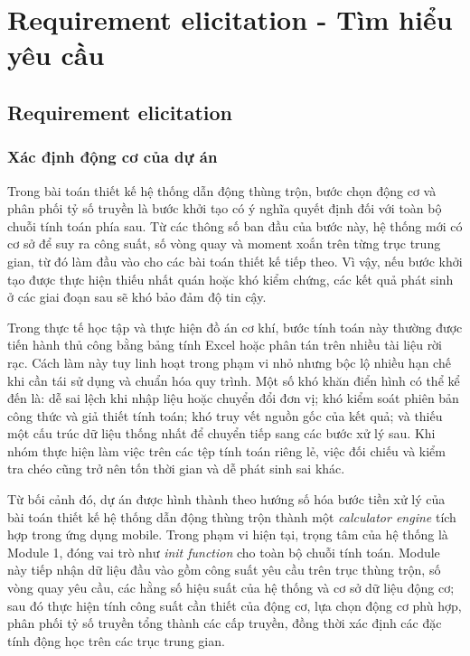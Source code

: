 \documentclass[a4paper]{article}
\begin{document}
\pagebreak
\tableofcontents
\pagebreak


\section{Requirement elicitation - Tìm hiểu yêu cầu }
\subsection{Requirement elicitation}

\subsubsection{Xác định động cơ của dự án}

Trong bài toán thiết kế hệ thống dẫn động thùng trộn, bước chọn động cơ và phân phối tỷ số truyền là bước khởi tạo có ý nghĩa quyết định đối với toàn bộ chuỗi tính toán phía sau. Từ các thông số ban đầu của bước này, hệ thống mới có cơ sở để suy ra công suất, số vòng quay và moment xoắn trên từng trục trung gian, từ đó làm đầu vào cho các bài toán thiết kế tiếp theo. Vì vậy, nếu bước khởi tạo được thực hiện thiếu nhất quán hoặc khó kiểm chứng, các kết quả phát sinh ở các giai đoạn sau sẽ khó bảo đảm độ tin cậy.

Trong thực tế học tập và thực hiện đồ án cơ khí, bước tính toán này thường được tiến hành thủ công bằng bảng tính Excel hoặc phân tán trên nhiều tài liệu rời rạc. Cách làm này tuy linh hoạt trong phạm vi nhỏ nhưng bộc lộ nhiều hạn chế khi cần tái sử dụng và chuẩn hóa quy trình. Một số khó khăn điển hình có thể kể đến là: dễ sai lệch khi nhập liệu hoặc chuyển đổi đơn vị; khó kiểm soát phiên bản công thức và giả thiết tính toán; khó truy vết nguồn gốc của kết quả; và thiếu một cấu trúc dữ liệu thống nhất để chuyển tiếp sang các bước xử lý sau. Khi nhóm thực hiện làm việc trên các tệp tính toán riêng lẻ, việc đối chiếu và kiểm tra chéo cũng trở nên tốn thời gian và dễ phát sinh sai khác.

Từ bối cảnh đó, dự án được hình thành theo hướng số hóa bước tiền xử lý của bài toán thiết kế hệ thống dẫn động thùng trộn thành một \textit{calculator engine} tích hợp trong ứng dụng mobile. Trong phạm vi hiện tại, trọng tâm của hệ thống là Module 1, đóng vai trò như \textit{init function} cho toàn bộ chuỗi tính toán. Module này tiếp nhận dữ liệu đầu vào gồm công suất yêu cầu trên trục thùng trộn, số vòng quay yêu cầu, các hằng số hiệu suất của hệ thống và cơ sở dữ liệu động cơ; sau đó thực hiện tính công suất cần thiết của động cơ, lựa chọn động cơ phù hợp, phân phối tỷ số truyền tổng thành các cấp truyền, đồng thời xác định các đặc tính động học trên các trục trung gian.
\end{document}
